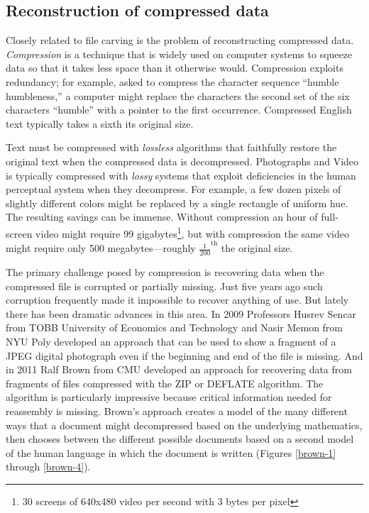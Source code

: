 \subsection{Reconstruction of compressed data}

Closely related to file carving is the problem of reconstructing
compressed data. \emph{Compression} is a technique that is widely used
on computer systems to squeeze data so that it takes less space than
it otherwise would. Compression exploits redundancy; for example,
asked to compress the character sequence ``humble humbleness,'' a computer might
replace the characters the second set of the six characters ``humble''
with a pointer to the first occurrence. Compressed English text typically
takes a sixth its original size.

Text must be compressed with \emph{lossless} algorithms that
faithfully restore the original text when the compressed data is
decompressed. Photographs and Video is
typically compressed with \emph{lossy} systems that exploit
deficiencies in the human perceptual system when they decompress. For
example, a few dozen pixels of slightly different colors might
be replaced by a single rectangle of uniform hue. The resulting
savings can be immense. Without compression an hour of
full-screen video might require 99 gigabytes\footnote{30 screens of
  640x480 video per second with 3 bytes per pixel}, but with
compression the same video might require only 500 megabytes---roughly
$\frac{1}{200}^\textrm{th}$ the original size. 

The primary challenge posed by compression is recovering data when the
compressed file is corrupted or partially missing. Just five years ago
such corruption frequently made it impossible to recover anything of
use. But lately there has been dramatic advances in this area. In 2009
Professors Husrev Sencar from TOBB University of Economics and
Technology and Nasir Memon from NYU Poly developed an approach that
can be used to show a fragment of a JPEG digital photograph even if
the beginning and end of the file is missing\cite{jpeg-recovery}. And
in 2011 Ralf Brown from CMU developed an approach for recovering data
from fragments of files compressed with the ZIP or DEFLATE
algorithm\cite{dfrws2011:RalfBrown}. The algorithm is particularly
impressive because critical information needed for reassembly is
missing. Brown's approach creates a model of the many different ways
that a document might decompressed based on the underlying
mathematics, then chooses between the different possible documents
based on a second model of the human language in which the document is
written (Figures \ref{brown-1} through \ref{brown-4}).

